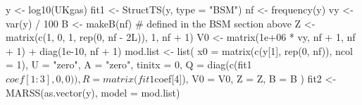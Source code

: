 \begin{Schunk}
\begin{Sinput}
 y <- log10(UKgas)
 fit1 <- StructTS(y, type = "BSM")
 nf <- frequency(y)
 vy <- var(y) / 100
 B <- makeB(nf) # defined in the BSM section above
 Z <- matrix(c(1, 0, 1, rep(0, nf - 2L)), 1, nf + 1)
 V0 <- matrix(1e+06 * vy, nf + 1, nf + 1) + diag(1e-10, nf + 1)
 mod.list <- list(
   x0 = matrix(c(y[1], rep(0, nf)), ncol = 1), 
   U = "zero", A = "zero", tinitx = 0,
   Q = diag(c(fit1$coef[1:3], 0, 0)), 
   R = matrix(fit1$coef[4]), 
   V0 = V0, Z = Z, B = B
 )
 fit2 <- MARSS(as.vector(y), model = mod.list)
\end{Sinput}
\end{Schunk}
